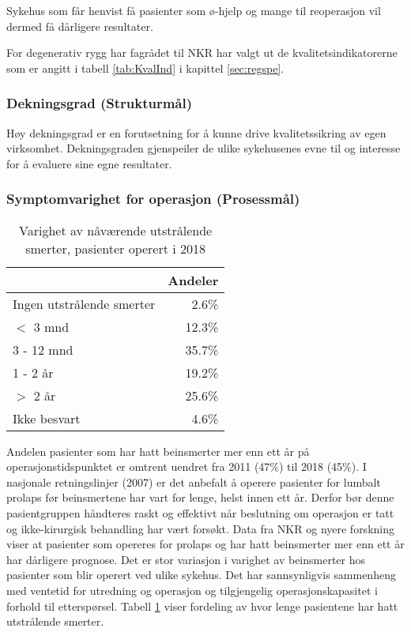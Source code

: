 \documentclass [norsk,a4paper,twoside]{article}\usepackage[]{graphicx}\usepackage[]{color}
\begin{document}
Sykehus som får henvist få pasienter som ø-hjelp og
mange til reoperasjon vil dermed få dårligere resultater. 

 



For degenerativ rygg har fagrådet til NKR har valgt ut de kvalitetsindikatorerne som er angitt i tabell \ref{tab:KvalInd}
i kapittel \ref{sec:regspe}. 

\subsubsection{Dekningsgrad (Strukturmål)}
Høy dekningsgrad er en forutsetning for å kunne drive kvalitetssikring av egen virksomhet. Dekningsgraden gjenspeiler de ulike sykehusenes evne til og interesse for å evaluere sine egne resultater.

\clearpage

\subsubsection{Symptomvarighet for operasjon (Prosessmål)} 
\begin{table}[ht]
\centering
\begin{tabular}{lr}
  \hline
 & Andeler \\ 
  \hline
Ingen utstrålende smerter & 2.6\% \\ 
  $<$ 3 mnd & 12.3\% \\ 
  3 - 12 mnd & 35.7\% \\ 
  1 - 2 år & 19.2\% \\ 
  $>$ 2 år & 25.6\% \\ 
  Ikke besvart & 4.6\% \\ 
   \hline
\end{tabular}
\caption{Varighet av nåværende utstrålende smerter, pasienter operert i 2018} 
\label{tab:Utstr}
\end{table}


Andelen pasienter som har hatt beinsmerter mer enn ett år på
operasjonstidspunktet er omtrent uendret fra 2011 (47\%) til 2018 (45\%). 
I nasjonale retningslinjer (2007) er det anbefalt å operere pasienter for lumbalt prolaps før
beinsmertene har vart for lenge, helst innen ett år. Derfor bør denne
pasientgruppen håndteres raskt og effektivt når beslutning om operasjon er tatt og
ikke-kirurgisk behandling har vært forsøkt. Data fra NKR og nyere forskning viser at
pasienter som opereres for prolaps og har hatt beinsmerter mer enn ett år har
dårligere prognose. 
Det er stor variasjon i varighet av beinsmerter hos pasienter som blir
operert ved ulike sykehus. Det har sannsynligvis sammenheng med ventetid for
utredning og operasjon og tilgjengelig operasjonskapasitet i forhold til etterspørsel.
Tabell  \ref{tab:Utstr} viser fordeling av hvor lenge pasientene har hatt utstrålende smerter. 
\end{document}
